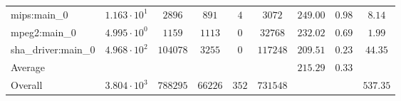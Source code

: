 \begin{tabular}{|l|c|c|c|c|c|c|c|c|}
mips:main\_0            & $ 1.163 \cdot 10^{1}  $ & $ 2896   $ & $ 891   $ & $ 4   $ & $ 3072   $ & $ 249.00      $ & $ 0.98    $ & $ 8.14    $ \\
mpeg2:main\_0           & $ 4.995 \cdot 10^{0}  $ & $ 1159   $ & $ 1113  $ & $ 0   $ & $ 32768  $ & $ 232.02      $ & $ 0.69    $ & $ 1.99    $ \\
sha\_driver:main\_0     & $ 4.968 \cdot 10^{2}  $ & $ 104078 $ & $ 3255  $ & $ 0   $ & $ 117248 $ & $ 209.51      $ & $ 0.23    $ & $ 44.35   $ \\
\hline
Average                 & $                     $ & $        $ & $       $ & $     $ & $        $ & $ 215.29      $ & $ 0.33    $ & $         $ \\
\hline
Overall                 & $ 3.804 \cdot 10^{3}  $ & $ 788295 $ & $ 66226 $ & $ 352 $ & $ 731548 $ & $             $ & $         $ & $ 537.35  $ \\
\hline
\end{tabular}
